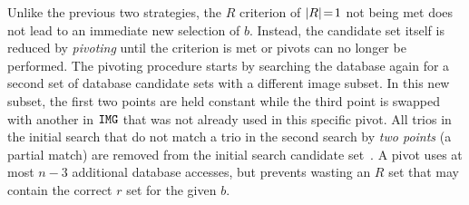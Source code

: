 Unlike the previous two strategies, the $R$ criterion of $|R| \!=\! 1$ not being met does not lead to an immediate new selection of $b$.
Instead, the candidate set itself is reduced by \textit{pivoting} until the criterion is met or pivots can no longer be performed.
The pivoting procedure starts by searching the database again for a second set of database candidate sets with a different image subset.
In this new subset, the first two points are held constant while the third point is swapped with another in $\texttt{IMG}$ that was not already used in this specific pivot.
All trios in the initial search that do not match a trio in the second search by \textit{two points} (a partial match) are removed from the initial search candidate set~\cite{coleAndCrassidis:sphericalTriangleMethod}.
A pivot uses at most $n - 3$ additional database accesses, but prevents wasting an $R$ set that may contain the correct $r$ set for the given $b$.

